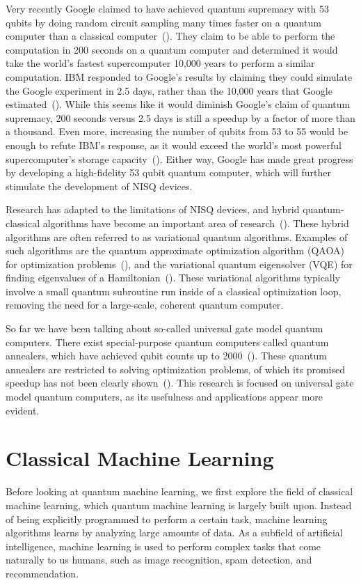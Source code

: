 \documentclass[a4paper,10pt]{article}
\begin{document}
Very recently Google claimed to have achieved quantum supremacy with 53 qubits by doing random circuit sampling many times faster on a quantum computer than a classical computer~(\cite{arute2019quantum}).
They claim to be able to perform the computation in 200 seconds on a quantum computer and determined it would take the world's fastest supercomputer 10,000 years to perform a similar computation.
IBM responded to Google's results by claiming they could simulate the Google experiment in 2.5 days, rather than the 10,000 years that Google estimated~(\cite{pednault2019leveraging}).
While this seems like it would diminish Google's claim of quantum supremacy, 200 seconds versus 2.5 days is still a speedup by a factor of more than a thousand.
Even more, increasing the number of qubits from 53 to 55 would be enough to refute IBM's response, as it would exceed the world's most powerful supercomputer's storage capacity~(\cite{aaronson2019supremacy}).
Either way, Google has made great progress by developing a high-fidelity 53 qubit quantum computer, which will further stimulate the development of NISQ devices.

Research has adapted to the limitations of NISQ devices, and hybrid quantum-classical algorithms have become an important area of research~(\cite{mcclean2016theory, guerreschi2017practical}).
These hybrid algorithms are often referred to as variational quantum algorithms.
Examples of such algorithms are the quantum approximate optimization algorithm (QAOA) for optimization problems~(\cite{qaoa}), and the variational quantum eigensolver (VQE) for finding eigenvalues of a Hamiltonian~(\cite{vqe}).
These variational algorithms typically involve a small quantum subroutine run inside of a classical optimization loop, removing the need for a large-scale, coherent quantum computer.

So far we have been talking about so-called universal gate model quantum computers.
There exist special-purpose quantum computers called quantum annealers, which have achieved qubit counts up to 2000~(\cite{dwave-2000}).
These quantum annealers are restricted to solving optimization problems, of which its promised speedup has not been clearly shown~(\cite{how-quantum-dwave, aaronson-dwave, detecting-quantum-speedup}).
This research is focused on universal gate model quantum computers, as its usefulness and applications appear more evident.

\section{Classical Machine Learning} \label{sec:classical-ml}
Before looking at quantum machine learning, we first explore the field of classical machine learning, which quantum machine learning is largely built upon.
Instead of being explicitly programmed to perform a certain task, machine learning algorithms learns by analyzing large amounts of data.
As a subfield of artificial intelligence, machine learning is used to perform complex tasks that come naturally to us humans, such as image recognition, spam detection, and recommendation.
\end{document}
